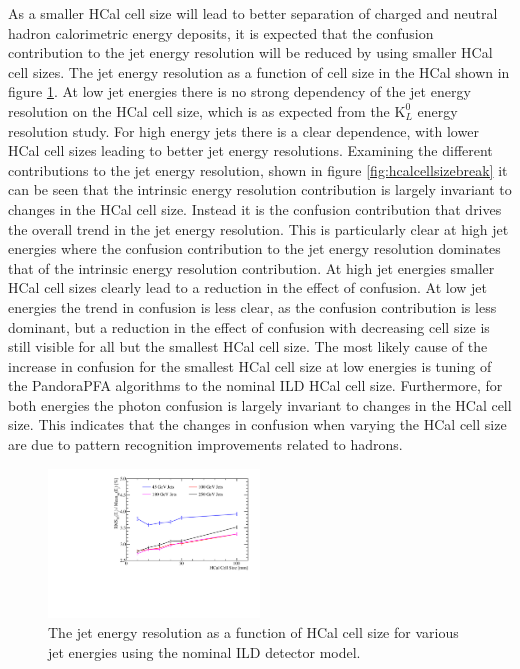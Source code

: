 As a smaller HCal cell size will lead to better separation of charged and neutral hadron calorimetric energy deposits, it is expected that the confusion contribution to the jet energy resolution will be reduced by using smaller HCal cell sizes.  The jet energy resolution as a function of cell size in the HCal shown in figure \ref{fig:hcalcellsize}.  At low jet energies there is no strong dependency of the jet energy resolution on the HCal cell size, which is as expected from the $\text{K}^{0}_{L}$ energy resolution study.  For high energy jets there is a clear dependence, with lower HCal cell sizes leading to better jet energy resolutions.  Examining the different contributions to the jet energy resolution, shown in figure \ref{fig:hcalcellsizebreak} it can be seen that the intrinsic energy resolution contribution is largely invariant to changes in the HCal cell size.  Instead it is the confusion contribution that drives the overall trend in the jet energy resolution.  This is particularly clear at high jet energies where the confusion contribution to the jet energy resolution dominates that of the intrinsic energy resolution contribution.  At high jet energies smaller HCal cell sizes clearly lead to a reduction in the effect of confusion.  At low jet energies the trend in confusion is less clear, as the confusion contribution is less dominant, but a reduction in the effect of confusion with decreasing cell size is still visible for all but the smallest HCal cell size.  The most likely cause of the increase in confusion for the smallest HCal cell size at low energies is tuning of the PandoraPFA algorithms to the nominal ILD HCal cell size.  Furthermore, for both energies the photon confusion is largely invariant to changes in the HCal cell size.  This indicates that the changes in confusion when varying the HCal cell size are due to pattern recognition improvements related to hadrons.

\begin{figure}[h!]
\centering
\includegraphics[width=0.5\textwidth]{OptimisationStudies/Plots/JetEnergyResolutions/JER_vs_HCalCellSize.pdf}
\caption[The jet energy resolution as a function of HCal cell size for various jet energies using the nominal ILD detector model.]{The jet energy resolution as a function of HCal cell size for various jet energies using the nominal ILD detector model.}
\label{fig:hcalcellsize}
\end{figure}

